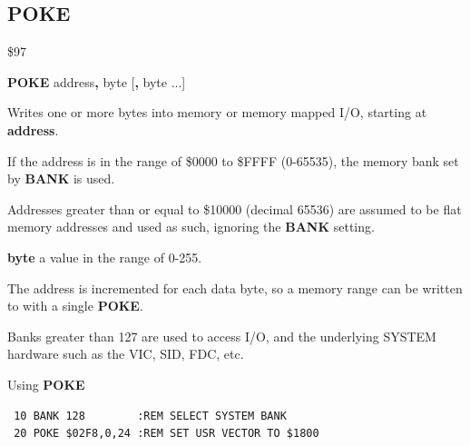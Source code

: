 \subsection{POKE}
\begin{description}[leftmargin=2cm,style=nextline]
\item [Token:] \$97
\item [Format:] {\bf POKE} address{\bf,} byte [{\bf,} byte ...]
\item [Usage:]  Writes one or more bytes into memory
                or memory mapped I/O, starting at
                {\bf address}.

                If the address is in the range of \$0000 to \$FFFF (0-65535), the
                memory bank set by {\bf BANK} is used.

                Addresses greater than or equal to \$10000 (decimal 65536) are assumed to be flat memory
                addresses and used as such, ignoring the {\bf BANK} setting.

                {\bf byte} a value in the range of 0-255.

\item [Remarks:] The address is incremented for each data byte,
                 so a memory range can be written to with a single {\bf POKE}.

                 Banks greater than 127 are used to access I/O, and the underlying SYSTEM hardware such as the
                 VIC, SID, FDC, etc.


\item [Example:] Using {\bf POKE}

\begin{tcolorbox}[colback=black,coltext=white]
\verbatimfont{\codefont}
\begin{verbatim}
 10 BANK 128        :REM SELECT SYSTEM BANK
 20 POKE $02F8,0,24 :REM SET USR VECTOR TO $1800
\end{verbatim}
\end{tcolorbox}
\end{description}


\newpage
